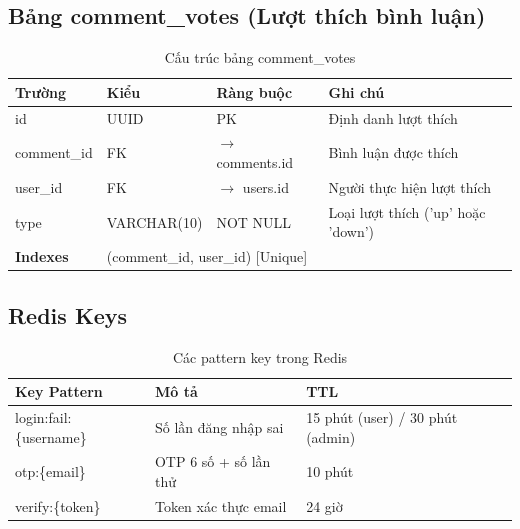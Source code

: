 \documentclass[12pt,a4paper]{article}
\begin{document}
\subsection{Bảng comment\_votes (Lượt thích bình luận)}
\begin{longtable}{|l|l|l|p{5.5cm}|}
    \caption{Cấu trúc bảng comment\_votes}                                                                                                    \\
    \hline
    \rowcolor{headerblue}
    \textbf{Trường}  & \textbf{Kiểu}                                         & \textbf{Ràng buộc}        & \textbf{Ghi chú}                   \\
    \hline
    id               & UUID                                                  & PK                        & Định danh lượt thích               \\
    \hline
    comment\_id      & FK                                                    & $\rightarrow$ comments.id & Bình luận được thích               \\
    \hline
    user\_id         & FK                                                    & $\rightarrow$ users.id    & Người thực hiện lượt thích         \\
    \hline
    type             & VARCHAR(10)                                           & NOT NULL                  & Loại lượt thích ('up' hoặc 'down') \\
    \hline
    \rowcolor{headerblue}
    \textbf{Indexes} & \multicolumn{3}{l|}{(comment\_id, user\_id) [Unique]}                                                                  \\
    \hline
\end{longtable}

\subsection{Redis Keys}
\begin{longtable}{|l|p{7.5cm}|l|}
    \caption{Các pattern key trong Redis}                                              \\
    \hline
    \rowcolor{headerblue}
    \textbf{Key Pattern}    & \textbf{Mô tả}        & \textbf{TTL}                     \\
    \hline
    login:fail:\{username\} & Số lần đăng nhập sai  & 15 phút (user) / 30 phút (admin) \\
    \hline
    otp:\{email\}           & OTP 6 số + số lần thử & 10 phút                          \\
    \hline
    verify:\{token\}        & Token xác thực email  & 24 giờ                           \\
    \hline
\end{longtable}
\end{document}
